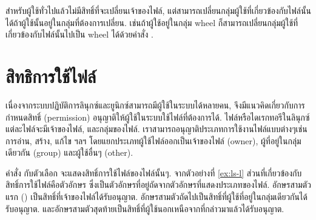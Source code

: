 \begin{thwbr}
สำหรับผู้ใช้ทั่วไปแล้วไม่มีสิทธิ์ที่จะเปลี่ยนเจ้าของไฟล์, แต่สามารถเปลี่ยนกลุ่มผู้ใช้ที่เกี่ยวข้องกับไฟล์นั้นได้ถ้าผู้ใช้นั้นอยู่ในกลุ่มที่ต้องการเปลี่ยน. เช่นถ้าผู้ใช้อยู่ในกลุ่ม wheel ก็สามารถเปลี่ยนกลุ่มผู้ใช้ที่เกี่ยวข้องกับไฟล์นั้นไปเป็น wheel ได้ด้วยคำสั่ง .
\begin{MyExample}
\end{MyExample}%

\section{สิทธิการใช้ไฟล์}


เนื่องจากระบบปฏิบัติการลินุกซ์และยูนิกซ์สามารถมีผู้ใช้ในระบบได้หลายคน, จึงมีแนวคิดเกี่ยวกับการกำหนดสิทธิ์ (permission) อนุญาติให้ผู้ใช้ในระบบใช้ไฟล์ที่ต้องการได้. ไฟล์หรือไดเรกทอรีในลินุกซ์แต่ละไฟล์จะมีเจ้าของไฟล์, และกลุ่มของไฟล์. เราสามารถอนุญาติประเภทการใช้งานไฟล์แบบต่างๆเช่นการอ่าน, สร้าง, แก้ไข ฯลฯ โดยแยกประเภทผู้ใช้ไฟล์ออกเป็นเจ้าของไฟล์ (owner), ผู้ที่อยู่ในกลุ่มเดียวกัน (group) และผู้ใช้อื่นๆ (other).

\begin{figure}[!htb]
\end{figure}

คำสั่ง  กับตัวเลือก  จะแสดงสิทธิ์การใช้ไฟล์ของไฟล์นั้นๆ. จากตัวอย่างที่ \ref{ex:ls-l} ส่วนที่เกี่ยวข้องกับสิทธิ์การใช้ไฟล์คือตัวอักษร  ซึ่งเป็นตัวอักษรที่อยู่ถัดจากตัวอักษรที่แสดงประเภทของไฟล์. อักษรสามตัวแรก () เป็นสิทธิ์ที่เจ้าของไฟล์ได้รับอนุญาต. อักษรสามตัวถัดไปเป็นสิทธิ์ที่ผู้ใช้ที่อยู่ในกลุ่มเดียวกันได้รับอนุญาต. และอักษรสามตัวสุดท้ายเป็นสิทธิ์ที่ผู้ใช้นอกเหนือจากที่กล่าวมาแล้วได้รับอนุญาต.


\end{thwbr}
